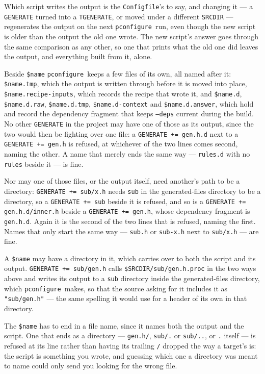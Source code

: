 \documentclass{article}
\newcommand{\pconfigure}{\texttt{pconfigure}}
\begin{document}
Which script writes the output is the \texttt{Configfile}'s to say,
and changing it --- a \texttt{GENERATE} turned into a
\texttt{TGENERATE}, or moved under a different \texttt{SRCDIR} ---
regenerates the output on the next \pconfigure\ run, even though the
new script is older than the output the old one wrote.  The new script's
answer goes through the same comparison as any other, so one that
prints what the old one did leaves the output, and everything built
from it, alone.

Beside \texttt{\$name} \pconfigure\ keeps a few files of its own, all
named after it: \texttt{\$name.tmp}, which the output is written
through before it is moved into place, \texttt{\$name.recipe-inputs},
which records the recipe that wrote it, and \texttt{\$name.d},
\texttt{\$name.d.raw}, \texttt{\$name.d.tmp},
\texttt{\$name.d-context} and \texttt{\$name.d.answer}, which hold
and record the dependency fragment that keeps \texttt{--deps} current
during the build.  No
other \texttt{GENERATE} in the project may have one of those as its
output, since the two would then be fighting over one file: a
\texttt{GENERATE += gen.h.d} next to a \texttt{GENERATE += gen.h} is
refused, at whichever of the two lines comes second, naming the other.
A name that merely ends the same way --- \texttt{rules.d} with no
\texttt{rules} beside it --- is fine.

Nor may one of those files, or the output itself, need another's path
to be a directory: \texttt{GENERATE += sub/x.h} needs \texttt{sub} in
the generated-files directory to be a directory, so a
\texttt{GENERATE += sub} beside it is refused, and so is a
\texttt{GENERATE += gen.h.d/inner.h} beside a \texttt{GENERATE +=
gen.h}, whose dependency fragment is \texttt{gen.h.d}.  Again it is
the second of the two lines that is refused, naming the first.  Names
that only start the same way --- \texttt{sub.h} or \texttt{sub-x.h}
next to \texttt{sub/x.h} --- are fine.

A \texttt{\$name} may have a directory in it, which carries over to
both the script and its output.  \texttt{GENERATE += sub/gen.h} calls
\texttt{\$SRCDIR/sub/gen.h.proc} in the two ways above and writes its
output to a \texttt{sub} directory inside the generated-files
directory, which \pconfigure\ makes, so that the source asking for it
includes it as \texttt{"sub/gen.h"} --- the same spelling it would use
for a header of its own in that directory.

The \texttt{\$name} has to end in a file name, since it names both the
output and the script.  One that ends as a directory ---
\texttt{gen.h/}, \texttt{sub/.} or \texttt{sub/..}, or \texttt{.}
itself --- is refused at its line rather than having its trailing
\texttt{/} dropped the way a target's is: the script is something
you wrote, and guessing which one a directory was meant to name could
only send you looking for the wrong file.
\end{document}
